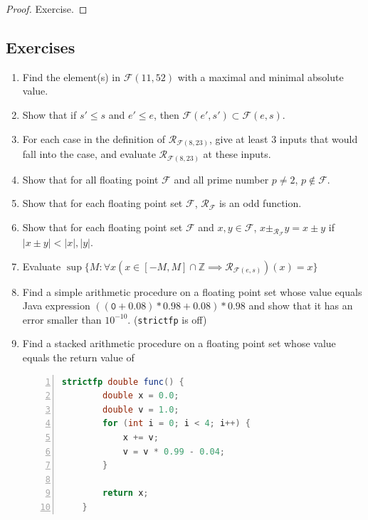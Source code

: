 \documentclass{book}
\theoremstyle{definition}\newtheorem{mechanism}{Mechanism}
\theoremstyle{remark}\newtheorem*{remark}{Remark}
\begin{document}
\begin{proof}
	Exercise.
\end{proof}

\subsection*{Exercises}

\begin{enumerate}
	\item Find the element(s) in $\mathcal F(11, 52)$ with a maximal and minimal absolute value.
	\item Show that if $s' \le s$ and $e' \le e$, then $\mathcal F(e', s')\subset \mathcal F(e, s)$.
	\item For each case in the definition of $\mathcal R_{\mathcal F(8, 23)}$, give at least 3 inputs that would fall into the case, and evaluate $\mathcal R_{\mathcal F(8, 23)}$ at these inputs.
	\item Show that for all floating point $\mathcal F$ and all prime number $p \ne 2$, $p \notin \mathcal F$.
	\item Show that for each floating point set $\mathcal F$, $\mathcal R_{\mathcal F}$ is an odd function.
	\item Show that for each floating point set $\mathcal F$ and $x, y \in \mathcal F$, $x \pm_{\mathcal R_{\mathcal F}} y = x \pm y$ if $|x \pm y| < |x|, |y|$.
	\item Evaluate $\sup \{M: \forall x(x\in [-M, M] \cap \mathbb Z \implies \mathcal R_{\mathcal F(e, s)})(x) = x\}$
	\item Find a simple arithmetic procedure on a floating point set whose value equals Java expression $\mathtt{((0 + 0.08) * 0.98 + 0.08) * 0.98}$ and show that it has an error smaller than $10^{-10}$. (\texttt{strictfp} is off)
	\item Find a stacked arithmetic procedure on a floating point set whose value equals the return value of
	
	\begin{lstlisting}[language=java, tabsize=4, numbers=left]
	strictfp double func() {
		double x = 0.0;
		double v = 1.0;
		for (int i = 0; i < 4; i++) {
			x += v;
			v = v * 0.99 - 0.04;
		}
		
		return x;
	}
	\end{lstlisting}
	

\end{enumerate}
\end{document}
